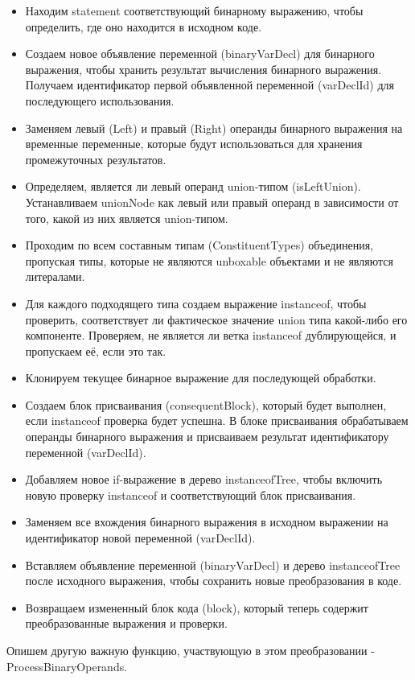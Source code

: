 \begin{itemize}[left=2em]
    \item Находим statement соответствующий бинарному выражению, чтобы определить, где оно находится в исходном коде.
    \item Создаем новое объявление переменной (binaryVarDecl) для бинарного выражения, чтобы хранить результат
    вычисления бинарного выражения.
    Получаем идентификатор первой объявленной переменной (varDeclId) для последующего использования.
    \item Заменяем левый (Left) и правый (Right) операнды бинарного выражения на временные переменные, которые
    будут использоваться для хранения промежуточных результатов.
    \item Определяем, является ли левый операнд union-типом (isLeftUnion).
    Устанавливаем unionNode как левый или правый операнд в зависимости от того, какой из них является union-типом.
    \item Проходим по всем составным типам (ConstituentTypes) объединения,
    пропуская типы, которые не являются unboxable объектами и не являются литералами.
    \item Для каждого подходящего типа создаем выражение instanceof, чтобы проверить, соответствует ли фактическое значение
    union типа какой-либо его компоненте.
    Проверяем, не является ли ветка instanceof дублирующейся, и пропускаем её, если это так.
    \item Клонируем текущее бинарное выражение для последующей обработки.
    \item Создаем блок присваивания (consequentBlock), который будет выполнен, если instanceof проверка будет успешна.
    В блоке присваивания обрабатываем операнды бинарного выражения и присваиваем результат идентификатору переменной (varDeclId).
    \item Добавляем новое if-выражение в дерево instanceofTree, чтобы включить новую проверку instanceof и
    соответствующий блок присваивания.
    \item Заменяем все вхождения бинарного выражения в исходном выражении на идентификатор новой переменной (varDeclId).
    \item Вставляем объявление переменной (binaryVarDecl) и дерево instanceofTree после исходного выражения,
    чтобы сохранить новые преобразования в коде.
    \item Возвращаем измененный блок кода (block), который теперь содержит преобразованные выражения и проверки.
\end{itemize}
Опишем другую важную функцию, участвующую в этом преобразовании - ProcessBinaryOperands.

